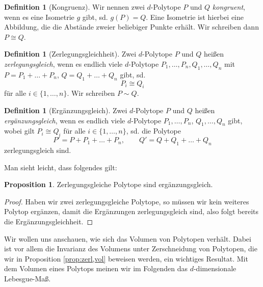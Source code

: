 \documentclass[11pt,titlepage]{article}
\theoremstyle{definition}
\newtheorem{proposition}[theorem]{Proposition}
\newtheorem{definition}[theorem]{Definition}
\theoremstyle{remark}
\begin{document}
	\begin{definition}[Kongruenz]
		Wir nennen zwei $d$-Polytope $P$ und $Q$ \textsl{kongruent}, wenn es eine Isometrie $g$ gibt, sd. 
		$g(P)=Q$. Eine Isometrie ist hierbei eine Abbildung, die die Abstände zweier beliebiger Punkte erhält. 
		Wir schreiben dann $P\cong Q$.
	\end{definition}
	
	\begin{definition}[Zerlegungsgleichheit]
		Zwei $d$-Polytope $P$ und $Q$ heißen \textsl{zerlegungsgleich}, wenn es endlich viele $d$-Polytope 
		$P_1,\ldots,P_n,Q_1,\ldots,Q_n$ mit $P=P_1 +\ldots +P_n$,  $Q=Q_1 +\ldots+Q_n$ 
		gibt, sd. 
		\[P_i\cong Q_i\]
		für alle $i\in\{1,\ldots,n\}$. Wir schreiben $P\sim Q$.
	\end{definition}
	
	\begin{definition}[Ergänzungsgleich]
		Zwei $d$-Polytope $P$ und $Q$ heißen \textsl{ergänzungsgleich}, wenn es endlich viele $d$-Polytope 
		$P_1,\ldots,P_n$, $Q_1,\ldots,Q_n$ gibt, wobei gilt $P_i\cong Q_i$ für alle $i\in\{1,\ldots,n\}$, sd. die Polytope
		\[P'=P+P_1+\ldots+P_n,\qquad Q'=Q+Q_1+\ldots+Q_n\]
		zerlegungsgleich sind.
	\end{definition}

	Man sieht leicht, dass folgendes gilt:
	
	\begin{proposition} \label{prop:zerl,erg}
		Zerlegungsgleiche Polytope sind ergänzungsgleich.
	\end{proposition}
	
	\begin{proof}	
		Haben wir zwei zerlegungsgleiche Polytope, so müssen wir kein weiteres Polytop ergänzen, damit die Ergänzungen zerlegungsgleich sind, also folgt bereits die Ergänzungsgleichheit.
	\end{proof}
	

	Wir wollen uns anschauen, wie sich das Volumen von Polytopen verhält. Dabei ist 
	vor allem die Invarianz des Volumens unter Zerschneidung von Polytopen, die wir in Proposition \ref{prop:zerl,vol} beweisen werden, ein wichtiges Resultat. Mit dem Volumen eines Polytops 
	meinen wir im Folgenden das $d$-dimensionale Lebesgue-Maß.
	
\end{document}
